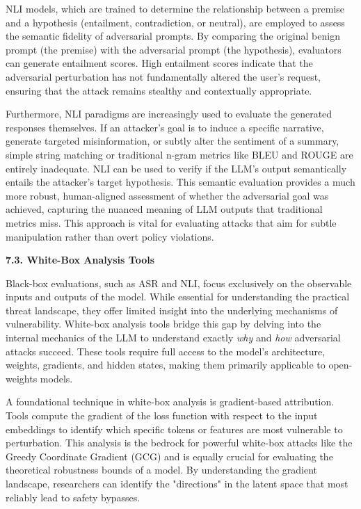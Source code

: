 \documentclass[11pt,a4paper]{article}
\begin{document}
NLI models, which are trained to determine the relationship between a premise and a hypothesis (entailment, contradiction, or neutral), are employed to assess the semantic fidelity of adversarial prompts. By comparing the original benign prompt (the premise) with the adversarial prompt (the hypothesis), evaluators can generate entailment scores. High entailment scores indicate that the adversarial perturbation has not fundamentally altered the user's request, ensuring that the attack remains stealthy and contextually appropriate. 

Furthermore, NLI paradigms are increasingly used to evaluate the generated responses themselves. If an attacker's goal is to induce a specific narrative, generate targeted misinformation, or subtly alter the sentiment of a summary, simple string matching or traditional n-gram metrics like BLEU and ROUGE are entirely inadequate. NLI can be used to verify if the LLM's output semantically entails the attacker's target hypothesis. This semantic evaluation provides a much more robust, human-aligned assessment of whether the adversarial goal was achieved, capturing the nuanced meaning of LLM outputs that traditional metrics miss. This approach is vital for evaluating attacks that aim for subtle manipulation rather than overt policy violations.

\textbf{7.3. White-Box Analysis Tools}

Black-box evaluations, such as ASR and NLI, focus exclusively on the observable inputs and outputs of the model. While essential for understanding the practical threat landscape, they offer limited insight into the underlying mechanisms of vulnerability. White-box analysis tools bridge this gap by delving into the internal mechanics of the LLM to understand exactly \textit{why} and \textit{how} adversarial attacks succeed. These tools require full access to the model's architecture, weights, gradients, and hidden states, making them primarily applicable to open-weights models.

A foundational technique in white-box analysis is gradient-based attribution. Tools compute the gradient of the loss function with respect to the input embeddings to identify which specific tokens or features are most vulnerable to perturbation. This analysis is the bedrock for powerful white-box attacks like the Greedy Coordinate Gradient (GCG) and is equally crucial for evaluating the theoretical robustness bounds of a model. By understanding the gradient landscape, researchers can identify the "directions" in the latent space that most reliably lead to safety bypasses.
\end{document}
